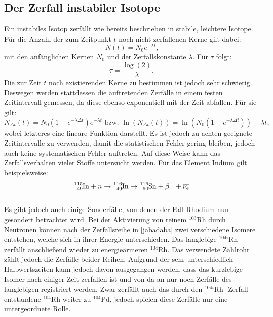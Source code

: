  \subsection{Der Zerfall instabiler Isotope}
 Ein instabiles Isotop zerfällt wie bereits beschrieben in stabile, leichtere Isotope. Für die Anzahl der zum Zeitpunkt $t$ noch nicht zerfallenen Kerne gilt dabei:
 \begin{equation}
   N(t) = N_0 e^{-\lambda t}\text{,}
   \end{equation}
mit den anfänglichen Kernen $N_0$ und der Zerfallskonstante $\lambda$.
Für $\tau$ folgt:
\begin{equation}
  \tau = \frac{\log(2)}{\lambda}\text{.}\label{T}
\end{equation}
Die zur Zeit $t$ noch existierenden Kerne zu bestimmen ist jedoch sehr schwierig.
Deswegen werden stattdessen die auftretenden Zerfälle in einem festen Zeitintervall gemessen, da diese ebenso exponentiell mit der Zeit abfallen. Für sie gilt:
\begin{equation}
  N_{\Delta t}(t) = N_0 \left(1 - e^{-\lambda \Delta t}\right)e^{- \lambda t} \text{  bzw.  } \ln \left( N_{\Delta t}(t) \right) = \ln \left( N_0(1- e^{- \lambda \Delta t}) \right) - \lambda t \text{,}
\end{equation}
wobei letzteres eine lineare Funktion darstellt.
Es ist jedoch zu achten geeignete Zeitintervalle zu verwenden, damit die statistischen Fehler gering bleiben, jedoch auch keine systematischen Fehler auftreten.
Auf diese Weise kann das Zerfallsverhalten vieler Stoffe untersucht werden. Für das Element Indium gilt beispielsweise:
\begin{equation}
  \ce{^{115}_{49}In} +n \rightarrow \ce{^{116}_{49}In} \rightarrow \ce{^{116}_{50}Sn} + \beta^- + \overline{\nu_\text{e}}
\end{equation}\\
Es gibt jedoch auch einige Sonderfälle, von denen der Fall Rhodium nun gesondert betrachtet wird.
Bei der Aktivierung von reinem $^{103}$Rh durch Neutronen können nach der Zerfallsreihe in \eqref{jabadaba}
zwei verschiedene Isomere entstehen, welche sich in ihrer Energie unterschieden. Das langlebige $^{104i}$Rh zerfällt anschließend wieder zu energieärmeren $^{104}$Rh.
Das verwendete Zählrohr zählt jedoch die Zerfälle beider Reihen. Aufgrund der sehr unterschiedlich Halbwertszeiten kann jedoch davon ausgegangen werden, dass das kurzlebige Isomer nach einiger Zeit zerfallen ist und von da an nur noch Zerfälle des langlebigen registriert werden. Zwar zerfällt auch das durch den $^{104i}$Rh- Zerfall entstandene $^{104}$Rh weiter zu $^{104}$Pd, jedoch spielen diese Zerfälle nur eine untergeordnete Rolle.
